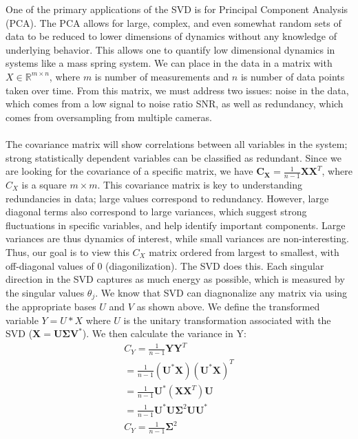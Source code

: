 \documentclass{article}
\begin{document}
	One of the primary applications of the SVD is for Principal Component Analysis (PCA). The PCA allows for large, complex, and even somewhat random sets of data to be reduced to lower dimensions of dynamics without any knowledge of underlying behavior. This allows one to quantify low dimensional dynamics in systems like a mass spring system. We can place in the data in a matrix with $X \in \mathbb { R } ^ { m \times n }$, where $m$ is number of measurements and $n$ is number of data points taken over time. From this matrix, we must address two issues: noise in the data, which comes from a low signal to noise ratio SNR, as well as redundancy, which comes from oversampling from multiple cameras. \\ \\
	The covariance matrix will show correlations between all variables in the system; strong statistically dependent variables can be classified as redundant. Since we are looking for the covariance of a specific matrix, we have $\mathbf { C } _ { \mathbf { X } } = \frac { 1 } { n - 1 } \mathbf { X X } ^ { T }$, where $C_X$ is a square $m \times m$. This covariance matrix is key to understanding redundancies in data; large values correspond to redundancy. However, large diagonal terms also correspond to large variances, which suggest strong fluctuations in specific variables, and help identify important components. Large variances are thus dynamics of interest, while small variances are non-interesting. Thus, our goal is to view this $C_X$ matrix ordered from largest to smallest, with off-diagonal values of 0 (diagonilization).
	The SVD does this. Each singular direction in the SVD captures as much energy as possible, which is measured by the singular values $\theta_j$.  We know that SVD can diagnonalize any matrix via using the appropriate bases $U$ and $V$ as shown above. We define the transformed variable $Y = U*X$ where $U$ is the unitary transformation associated with the SVD ($\mathbf { X } = \mathbf { U } \boldsymbol { \Sigma } \mathbf { V } ^ { * }$). We then calculate the variance in Y:
 \begin{align*}
C_Y = \frac { 1 } { n - 1 } \mathbf { Y } \mathbf { Y } ^ { T }\\
= \frac { 1 } { n - 1 } \left( \mathbf { U } ^ { * } \mathbf { X } \right) \left( \mathbf { U } ^ { * } \mathbf { X } \right) ^ { T } \\
= \frac { 1 } { n - 1 } \mathbf { U } ^ { * } \left( \mathbf { X } \mathbf { X } ^ { T } \right) \mathbf { U } \\
= \frac { 1 } { n - 1 } \mathbf { U } ^ { * } \mathbf { U } \boldsymbol { \Sigma } ^ { 2 } \mathbf { U } \mathbf { U } ^ { * } \\
C_Y= \frac { 1 } { n - 1 } \mathbf { \Sigma } ^ { 2 }
\end{align*}
\end{document}

